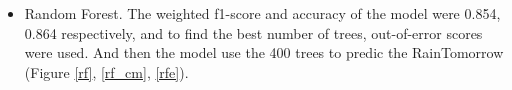 \documentclass[12pt]{article}
\begin{document}
\begin{itemize}
    \begin{figure}[H]
      \centering
      \hfill
    \end{figure}

    \item Random Forest. The weighted f1-score and accuracy of the model were 0.854, 0.864 respectively, and to find the best number of trees, out-of-error scores were used. And then the model use the 400 trees to predic the RainTomorrow (Figure \ref{rf}, \ref{rf_cm}, \ref{rfe}).


\end{itemize}
\end{document}
